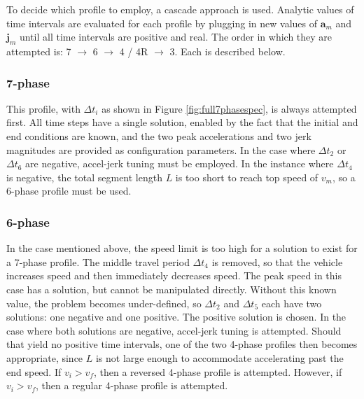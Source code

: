 \documentclass[letterpaper, 10 pt, conference]{ieeeconf}  %
\begin{document}
To decide which profile to employ, a cascade approach is used.
Analytic values of time intervals are evaluated for each profile by plugging in new values of $\mathbf{a}_m$ and $\mathbf{j}_m$ until all time intervals are positive and real.
The order in which they are attempted is: 7 $\rightarrow$ 6 $\rightarrow$ 4 / 4R $\rightarrow$ 3.
Each is described below.

\subsubsection{7-phase} \label{sec:7phase}

This profile, with $\Delta t_i$ as shown in Figure \ref{fig:full7phasespec}, is always attempted first.
All time steps have a single solution, enabled by the fact that the initial and end conditions are known, and the two peak accelerations and two jerk magnitudes are provided as configuration parameters.
In the case where $\Delta t_2$ or $\Delta t_6$ are negative, accel-jerk tuning must be employed.
In the instance where $\Delta t_4$ is negative, the total segment length $L$ is too short to reach top speed of $v_m$, so a 6-phase profile must be used.

\subsubsection{6-phase} \label{sec:6phase}

In the case mentioned above, the speed limit is too high for a solution to exist for a 7-phase profile.
The middle travel period $\Delta t_4$ is removed, so that the vehicle increases speed and then immediately decreases speed. 
The peak speed in this case has a solution, but cannot be manipulated directly.
Without this known value, the problem becomes under-defined, so $\Delta t_2$ and $\Delta t_5$ each have two solutions: one negative and one positive.
The positive solution is chosen.
In the case where both solutions are negative, accel-jerk tuning is attempted. 
Should that yield no positive time intervals, one of the two 4-phase profiles then becomes appropriate, since $L$ is not large enough to accommodate accelerating past the end speed.
If $v_i > v_f$, then a reversed 4-phase profile is attempted.
However, if $v_i > v_f$, then a regular 4-phase profile is attempted.
\end{document}
